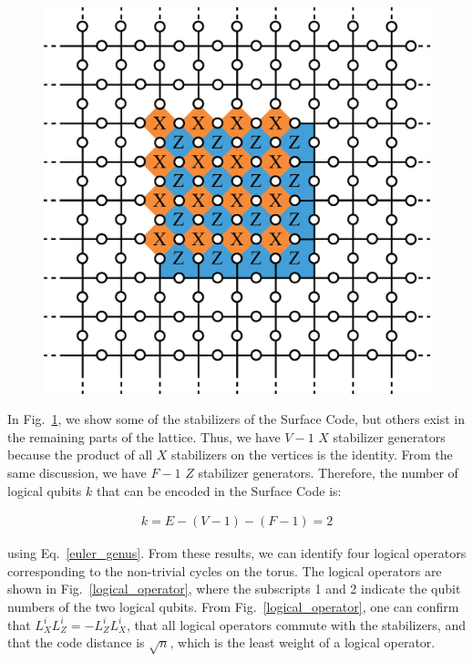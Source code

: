 \documentclass[a4paper,11pt]{ltjsarticle}
\begin{document}
{{        \begin{figure}[h]
            \centering
            \includegraphics[scale=0.40]{figure/local.eps}
            \vspace{0pt}\caption{}
            \label{local}
            \vspace{-10pt}
        \end{figure}
    
        In Fig.~\ref{local}, we show some of the stabilizers of the Surface Code, but others exist in the remaining parts of the lattice. Thus, we have $V - 1$ $X$ stabilizer generators because the product of all $X$ stabilizers on the vertices is the identity. From the same discussion, we have $F - 1$ $Z$ stabilizer generators. Therefore, the number of logical qubits $k$ that can be encoded in the Surface Code is:

    \begin{align}
        k = E - (V - 1) - (F - 1) = 2
    \end{align} 

    using Eq.~\ref{euler_genus}. From these results, we can identify four logical operators corresponding to the non-trivial cycles on the torus. The logical operators are shown in Fig.~\ref{logical_operator}, where the subscripts 1 and 2 indicate the qubit numbers of the two logical qubits. From Fig.~\ref{logical_operator}, one can confirm that $L^i_XL^i_Z = -L^i_ZL^i_X$, that all logical operators commute with the stabilizers, and that the code distance is $\sqrt{n}$, which is the least weight of a logical operator.

}}
\end{document}
